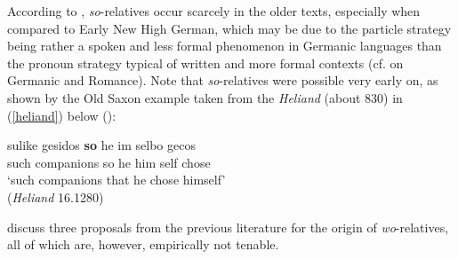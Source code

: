 According to \citet[137]{brandnerbraeuning2013}, \textit{so}-relatives occur scarcely in the older texts, especially when compared to Early New High German, which may be due to the particle strategy being rather a spoken and less formal phenomenon in Germanic languages than the pronoun strategy typical of written and more formal contexts (cf. \citealt{fiorentino2007} on Germanic and Romance). Note that \textit{so}-relatives were possible very early on, as shown by the Old Saxon example taken from the \textit{Heliand} (about 830) in (\ref{heliand}) below (\citealt[138, ex. 20]{brandnerbraeuning2013}):

\ea \gll sulike gesidos \textbf{so} he im selbo gecos \label{heliand}\\
such companions so he him self chose\\
\glt `such companions that he chose himself'\\(\textit{Heliand} 16.1280)
\z

\citet[138--146]{brandnerbraeuning2013} discuss three proposals from the previous literature for the origin of \textit{wo}-relatives, all of which are, however, empirically not tenable.

